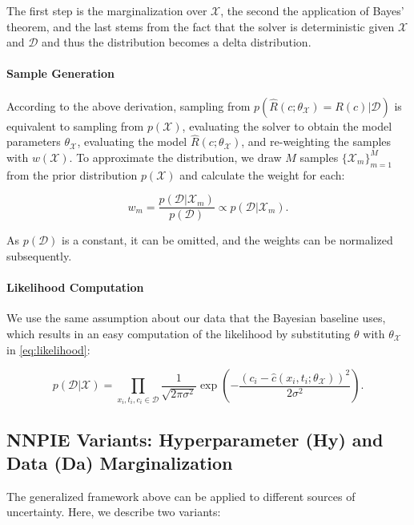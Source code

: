 The first step is the marginalization over $\mathcal{X}$, the second the application of Bayes' theorem, and the last stems from the fact that the solver is deterministic given $\mathcal{X}$ and $\mathcal{D}$ and thus the distribution becomes a delta distribution.


\paragraph{Sample Generation}

According to the above derivation, sampling from $p(\hat{R}(c;\theta_{\mathcal{X}}) = R(c)| \mathcal{D})$ is equivalent to sampling from $p(\mathcal{X})$, evaluating the solver to obtain the model parameters $\theta_{\mathcal{X}}$, evaluating the model $\hat{R}(c;\theta_{\mathcal{X}})$, and re-weighting the samples with $w(\mathcal{X})$. To approximate the distribution, we draw $M$ samples $\{\mathcal{X}_m\}_{m=1}^M$ from the prior distribution $p(\mathcal{X})$ and calculate the weight for each:

\begin{equation*}
w_m = \frac{p(\mathcal{D} | \mathcal{X}_m)}{p(\mathcal{D})} \propto p(\mathcal{D} | \mathcal{X}_m) .
\end{equation*}

As $p(\mathcal{D})$ is a constant, it can be omitted, and the weights can be normalized subsequently.


\paragraph{Likelihood Computation}

We use the same assumption about our data that the Bayesian baseline uses, which results in an easy computation of the likelihood by substituting $\theta$ with $\theta_{\mathcal{X}}$ in \cref{eq:likelihood}:

\begin{equation*}
p(\mathcal{D} | \mathcal{X}) = \prod_{x_i, t_i, c_i \in \mathcal{D}} \frac{1}{\sqrt{2\pi \sigma^2}} \exp \left( -\frac{(c_i - \hat{c}(x_i,t_i;\theta_{\mathcal{X}}))^2}{2\sigma^2} \right) .
\end{equation*}

\subsection{NNPIE Variants: Hyperparameter (Hy) and Data (Da) Marginalization}

The generalized framework above can be applied to different sources of uncertainty. Here, we describe two variants:

